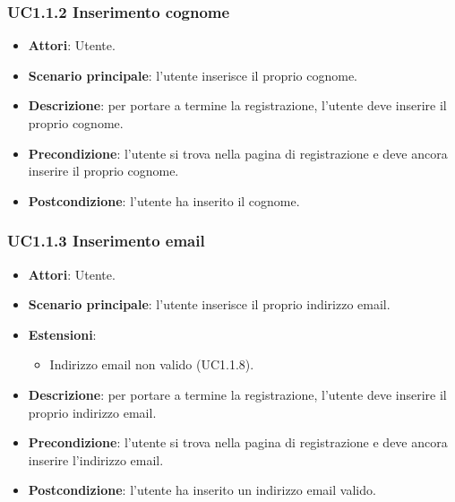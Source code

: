 \subsubsection{UC1.1.2 Inserimento cognome}
\begin{itemize}
\item \textbf{Attori}: Utente.
\item \textbf{Scenario principale}: l'utente inserisce il proprio cognome.
\item \textbf{Descrizione}: per portare a termine la registrazione, l'utente deve inserire il proprio cognome.
\item \textbf{Precondizione}: l'utente si trova nella pagina di registrazione e deve ancora inserire il proprio cognome.
\item \textbf{Postcondizione}: l'utente ha inserito il cognome.
\end{itemize}
\subsubsection{UC1.1.3 Inserimento email}
\begin{itemize}
\item \textbf{Attori}: Utente.
\item \textbf{Scenario principale}: l'utente inserisce il proprio indirizzo email.
\item \textbf{Estensioni}:
\begin{itemize}
\item Indirizzo email non valido (UC1.1.8).
\end{itemize}
\item \textbf{Descrizione}: per portare a termine la registrazione, l'utente deve inserire il proprio indirizzo email.
\item \textbf{Precondizione}: l'utente si trova nella pagina di registrazione e deve ancora inserire l'indirizzo email.
\item \textbf{Postcondizione}: l'utente ha inserito un indirizzo email valido.
\end{itemize}
